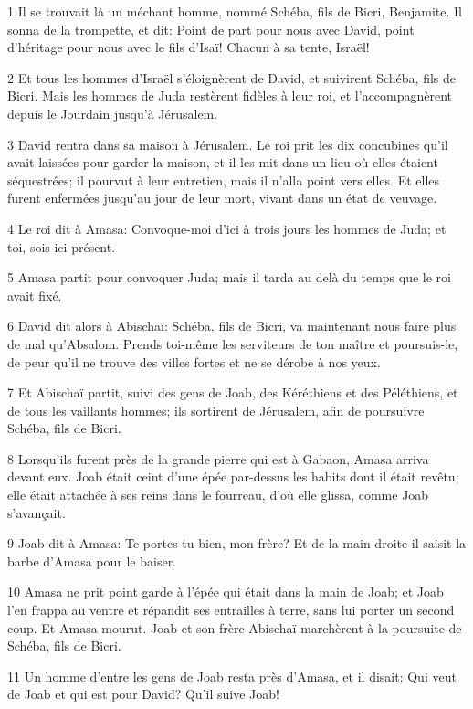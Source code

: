 \par 1 Il se trouvait là un méchant homme, nommé Schéba, fils de Bicri, Benjamite. Il sonna de la trompette, et dit: Point de part pour nous avec David, point d'héritage pour nous avec le fils d'Isaï! Chacun à sa tente, Israël!
\par 2 Et tous les hommes d'Israël s'éloignèrent de David, et suivirent Schéba, fils de Bicri. Mais les hommes de Juda restèrent fidèles à leur roi, et l'accompagnèrent depuis le Jourdain jusqu'à Jérusalem.
\par 3 David rentra dans sa maison à Jérusalem. Le roi prit les dix concubines qu'il avait laissées pour garder la maison, et il les mit dans un lieu où elles étaient séquestrées; il pourvut à leur entretien, mais il n'alla point vers elles. Et elles furent enfermées jusqu'au jour de leur mort, vivant dans un état de veuvage.
\par 4 Le roi dit à Amasa: Convoque-moi d'ici à trois jours les hommes de Juda; et toi, sois ici présent.
\par 5 Amasa partit pour convoquer Juda; mais il tarda au delà du temps que le roi avait fixé.
\par 6 David dit alors à Abischaï: Schéba, fils de Bicri, va maintenant nous faire plus de mal qu'Absalom. Prends toi-même les serviteurs de ton maître et poursuis-le, de peur qu'il ne trouve des villes fortes et ne se dérobe à nos yeux.
\par 7 Et Abischaï partit, suivi des gens de Joab, des Kéréthiens et des Péléthiens, et de tous les vaillants hommes; ils sortirent de Jérusalem, afin de poursuivre Schéba, fils de Bicri.
\par 8 Lorsqu'ils furent près de la grande pierre qui est à Gabaon, Amasa arriva devant eux. Joab était ceint d'une épée par-dessus les habits dont il était revêtu; elle était attachée à ses reins dans le fourreau, d'où elle glissa, comme Joab s'avançait.
\par 9 Joab dit à Amasa: Te portes-tu bien, mon frère? Et de la main droite il saisit la barbe d'Amasa pour le baiser.
\par 10 Amasa ne prit point garde à l'épée qui était dans la main de Joab; et Joab l'en frappa au ventre et répandit ses entrailles à terre, sans lui porter un second coup. Et Amasa mourut. Joab et son frère Abischaï marchèrent à la poursuite de Schéba, fils de Bicri.
\par 11 Un homme d'entre les gens de Joab resta près d'Amasa, et il disait: Qui veut de Joab et qui est pour David? Qu'il suive Joab!
